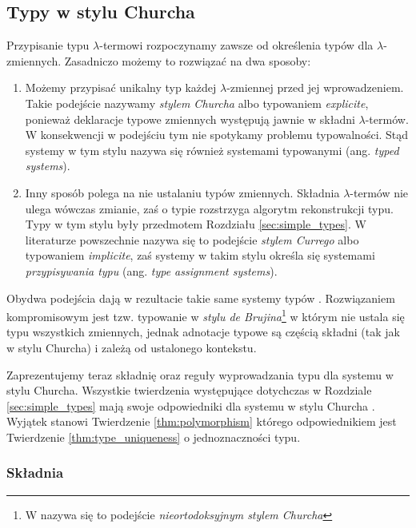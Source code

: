 \subsection{Typy w stylu Churcha}
Przypisanie typu \(\lambda\)-termowi rozpoczynamy zawsze od określenia typów dla \(\lambda\)-zmiennych. Zasadniczo możemy to rozwiązać na dwa sposoby:

\begin{enumerate}
  \item Możemy przypisać unikalny typ każdej \(\lambda\)-zmiennej przed jej wprowadzeniem. Takie podejście nazywamy \emph{stylem Churcha} albo typowaniem \emph{explicite}, ponieważ deklaracje typowe zmiennych występują jawnie w składni \(\lambda\)-termów. W konsekwencji w podejściu tym nie spotykamy problemu typowalności. Stąd systemy w tym stylu nazywa się również systemami {typowanymi} (ang. \emph{typed systems}).
  \item Inny sposób polega na nie ustalaniu typów zmiennych. Składnia \(\lambda\)-termów nie ulega wówczas zmianie, zaś o typie rozstrzyga algorytm rekonstrukcji typu. Typy w tym stylu były przedmotem Rozdziału \ref{sec:simple_types}. W literaturze powszechnie nazywa się to podejście \emph{stylem Currego} albo typowaniem \emph{implicite}, zaś systemy w takim stylu określa się systemami \emph{przypisywania typu} (ang. \emph{type assignment systems}).
\end{enumerate}

Obydwa podejścia dają w rezultacie takie same systemy typów \cite[3.4]{Urzyczyn2006}.  %
Rozwiązaniem kompromisowym jest tzw. typowanie w \emph{stylu de Brujina}\footnote{W \cite{Urzyczyn2006} nazywa się to podejście \emph{nieortodoksyjnym stylem Churcha}} \cite[1A.33]{barendregt_dekkers_statman_2013} w którym nie ustala się typu wszystkich zmiennych, jednak adnotacje typowe są częścią składni (tak jak w stylu Churcha) i zależą od ustalonego kontekstu. 

Zaprezentujemy teraz składnię oraz reguły wyprowadzania typu dla systemu w stylu Churcha. Wszystkie twierdzenia występujące dotychczas w Rozdziale \ref{sec:simple_types} mają swoje odpowiedniki dla systemu w stylu Churcha \cite[Rozdział 2.10]{nederpelt_geuvers_2014}. Wyjątek stanowi Twierdzenie \ref{thm:polymorphism} którego odpowiednikiem jest Twierdzenie \ref{thm:type_uniqueness} o jednoznaczności typu.

\subsubsection{Składnia}


\begin{twierdzenie}\label{thm:type_uniqueness}
\end{twierdzenie}
